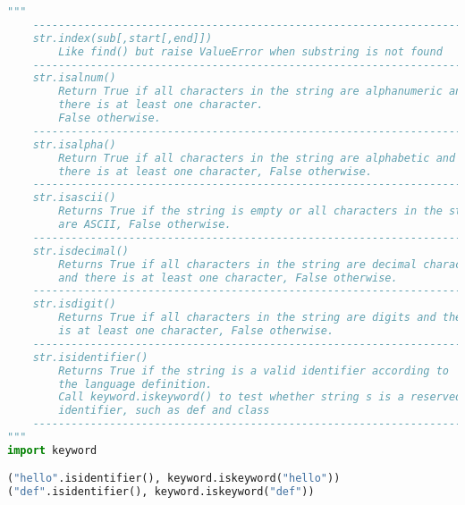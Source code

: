 \documentclass[a4paper,landscape]{report}
\begin{document}
\begin{lstlisting}[language=Python]
"""
    ---------------------------------------------------------------------
    str.index(sub[,start[,end]])
        Like find() but raise ValueError when substring is not found
    ---------------------------------------------------------------------
    str.isalnum()
        Return True if all characters in the string are alphanumeric and
        there is at least one character.
        False otherwise.
    ---------------------------------------------------------------------
    str.isalpha()
        Return True if all characters in the string are alphabetic and 
        there is at least one character, False otherwise. 
    ---------------------------------------------------------------------
    str.isascii()
        Returns True if the string is empty or all characters in the string
        are ASCII, False otherwise.
    ---------------------------------------------------------------------
    str.isdecimal()
        Returns True if all characters in the string are decimal characters
        and there is at least one character, False otherwise.
    ---------------------------------------------------------------------
    str.isdigit()
        Returns True if all characters in the string are digits and there
        is at least one character, False otherwise.
    ---------------------------------------------------------------------
    str.isidentifier()
        Returns True if the string is a valid identifier according to
        the language definition.
        Call keyword.iskeyword() to test whether string s is a reserved
        identifier, such as def and class
    ---------------------------------------------------------------------
"""
import keyword

("hello".isidentifier(), keyword.iskeyword("hello"))
("def".isidentifier(), keyword.iskeyword("def"))


\end{lstlisting}
\end{document}
